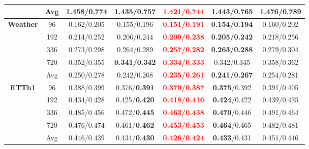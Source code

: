 \begin{table}[!htbp]
{\begin{tabular}{c|c|c|c|c|c|c}
& Avg & 1.458/0.774 & \textbf{1.435/0.757} & \textbf{\textcolor{red}{1.421/0.744}} & 1.443/0.765 & 1.476/0.789 \\
\midrule
\multirow{5}{*}{\textbf{Weather}}
& 96 & 0.162/0.205 & 0.155/0.196 & \textbf{\textcolor{red}{0.151/0.191}} & \textbf{0.154/0.194} & 0.160/0.202 \\
& 192 & 0.214/0.252 & 0.206/0.244 & \textbf{\textcolor{red}{0.200/0.238}} & \textbf{0.205/0.242} & 0.218/0.256 \\
& 336 & 0.273/0.298 & 0.264/0.289 & \textbf{\textcolor{red}{0.257/0.282}} & \textbf{0.263/0.288} & 0.279/0.304 \\
& 720 & 0.352/0.355 & \textbf{0.341/0.342} & \textbf{\textcolor{red}{0.334/0.333}} & 0.342/0.345 & 0.358/0.362 \\
& Avg & 0.250/0.278 & 0.242/0.268 & \textbf{\textcolor{red}{0.235/0.261}} & \textbf{0.241/0.267} & 0.254/0.281 \\
\midrule
\multirow{5}{*}{\textbf{ETTh1}}
& 96 & 0.388/0.399 & 0.376/\textbf{0.391} & \textbf{\textcolor{red}{0.370/0.387}} & \textbf{0.375}/0.392 & 0.391/0.405 \\
& 192 & 0.434/0.428 & 0.425/\textbf{0.420} & \textbf{\textcolor{red}{0.418/0.416}} & \textbf{0.424}/0.422 & 0.439/0.435 \\
& 336 & 0.485/0.456 & 0.472/\textbf{0.445} & \textbf{\textcolor{red}{0.463/0.438}} & \textbf{0.470}/0.446 & 0.491/0.464 \\
& 720 & 0.476/0.474 & 0.461/\textbf{0.462} & \textbf{\textcolor{red}{0.453/0.453}} & \textbf{0.464}/0.465 & 0.482/0.481 \\
& Avg & 0.446/0.439 & 0.434/\textbf{0.430} & \textbf{\textcolor{red}{0.426/0.424}} & \textbf{0.433}/0.431 & 0.451/0.446 \\
\bottomrule
\end{tabular}
}
\end{table} \begin{table}[!htbp]
\centering
\small
\setlength{\tabcolsep}{3.6pt}
\renewcommand{\arraystretch}{0.96}
\label{tab:chap5-sensitivity-scale}
\end{table}
